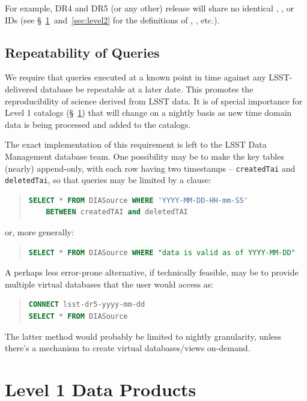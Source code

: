 \documentclass[SE,lsstdraft,toc]{lsstdoc}
\newcommand{\marginreq}[1]{\marginpar{\hspace{0pt}\tiny #1}}
\newcommand{\dmreq}[1]{\marginreq{DMS-REQ-#1}}
\begin{document}
For example, DR4 and DR5 (or any other) release will share no identical \Object, \Source, \DIAObject or \DIASource IDs (see \S~\ref{sec:level1}~and~\ref{sec:level2} for the definitions of \Objects, \DIAObjects, etc.).

\subsection{Repeatability of Queries}
\dmreq{0291}

We require that queries executed at a known point in time against any LSST-delivered database be repeatable at a later date. This promotes the reproducibility of science derived from LSST data. It is of special importance for Level 1 catalogs (\S~\ref{sec:level1}) that will change on a nightly basis as new time domain data is being processed and added to the catalogs.

The exact implementation of this requirement is left to the LSST Data Management database team. One possibility may be to make the key tables (nearly) append-only, with each row having two timestamps -- \texttt{createdTai} and \texttt{deletedTai}, so that queries may be limited by a  clause:
%
\begin{quote}
\begin{lstlisting}[language=SQL]
SELECT * FROM DIASource WHERE 'YYYY-MM-DD-HH-mm-SS'
    BETWEEN createdTAI and deletedTAI
\end{lstlisting}
\end{quote}
%
or, more generally:
%
\begin{quote}
\begin{lstlisting}[language=SQL,showstringspaces=false]
SELECT * FROM DIASource WHERE "data is valid as of YYYY-MM-DD"
\end{lstlisting}
\end{quote}
%
A perhaps less error-prone alternative, if technically feasible, may be to provide multiple virtual databases that the user would access as:
%
\begin{quote}
\begin{lstlisting}[language=SQL]
CONNECT lsst-dr5-yyyy-mm-dd
SELECT * FROM DIASource
\end{lstlisting}
\end{quote}
%
The latter method would probably be limited to nightly granularity, unless there's a mechanism to create virtual databases/views on-demand.

\clearpage

\section{Level 1 Data Products}
\label{sec:level1}
\end{document}
